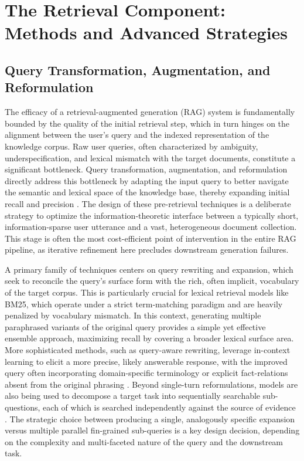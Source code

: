 \documentclass[11pt,a4paper]{article}
\begin{document}
\section{The Retrieval Component: Methods and Advanced Strategies}



\subsection{Query Transformation, Augmentation, and Reformulation}


The efficacy of a retrieval-augmented generation (RAG) system is fundamentally bounded by the quality of the initial retrieval step, which in turn hinges on the alignment between the user's query and the indexed representation of the knowledge corpus. Raw user queries, often characterized by ambiguity, underspecification, and lexical mismatch with the target documents, constitute a significant bottleneck. Query transformation, augmentation, and reformulation directly address this bottleneck by adapting the input query to better navigate the semantic and lexical space of the knowledge base, thereby expanding initial recall and precision \cite{arxiv:2202.01110v2}. The design of these pre-retrieval techniques is a deliberate strategy to optimize the information-theoretic interface between a typically short, information-sparse user utterance and a vast, heterogeneous document collection. This stage is often the most cost-efficient point of intervention in the entire RAG pipeline, as iterative refinement here precludes downstream generation failures.

A primary family of techniques centers on query rewriting and expansion, which seek to reconcile the query's surface form with the rich, often implicit, vocabulary of the target corpus. This is particularly crucial for lexical retrieval models like BM25, which operate under a strict term-matching paradigm and are heavily penalized by vocabulary mismatch. In this context, generating multiple paraphrased variants of the original query \cite{arxiv:2501.07391v1} provides a simple yet effective ensemble approach, maximizing recall by covering a broader lexical surface area. More sophisticated methods, such as query-aware rewriting, leverage in-context learning to elicit a more precise, likely answerable response, with the improved query often incorporating domain-specific terminology or explicit fact-relations absent from the original phrasing \cite{arxiv:2501.07391v1}. Beyond single-turn reformulations, models are also being used to decompose a target task into sequentially searchable sub-questions, each of which is searched independently against the source of evidence \cite{arxiv:2502.11371v3}. The strategic choice between producing a single, analogously specific expansion versus multiple parallel fin-grained sub-queries is a key design decision, depending on the complexity and multi-faceted nature of the query and the downstream task.
\end{document}
